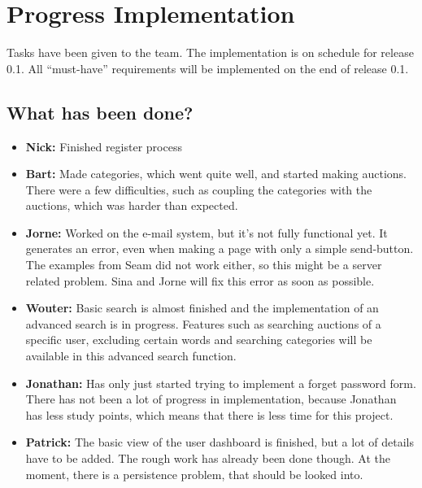 \documentclass[a4paper, 12pt]{article}
\begin{document}
	\section{Progress Implementation}
Tasks have been given to the team. The implementation is on schedule for release 0.1. All ``must-have'' requirements will be implemented on the end of release 0.1.
		\subsection{What has been done?}	
		\begin{itemize} 
			\item \textbf{Nick:} Finished register process
			\item \textbf{Bart:} Made categories, which went quite well, and started making auctions. There were a few difficulties, such as coupling the categories with the auctions, which was harder than expected.
			\item \textbf{Jorne:} Worked on the e-mail system, but it's not fully functional yet. It generates an error, even when making a page with only a simple send-button. The examples from Seam did not work either, so this might be a server related problem.  Sina and Jorne will fix this error as soon as possible.
			\item \textbf{Wouter:} Basic search is almost finished and the implementation of an advanced search is in progress. Features such as searching auctions of a specific user, excluding certain words and searching categories will be available in this advanced search function.
			\item \textbf{Jonathan:} Has only just started trying to implement a forget password form.  There has not been a lot of progress in implementation, because Jonathan has less study points, which means that there is less time for this project.
			\item \textbf{Patrick:} The basic view of the user dashboard is finished, but a lot of details have to be added. The rough work has already been done though. At the moment, there is a persistence problem, that should be looked into.
		\end{itemize}
\end{document}
